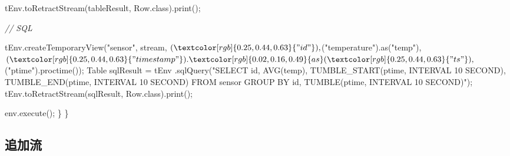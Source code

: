 \documentclass[cn,11pt,chinese]{elegantbook}
\newenvironment{Shaded}{}{}
\newcommand{\CommentTok}[1]{\textcolor[rgb]{0.38,0.63,0.69}{\textit{#1}}}
\newcommand{\FunctionTok}[1]{\textcolor[rgb]{0.02,0.16,0.49}{#1}}
\newcommand{\NormalTok}[1]{#1}
\newcommand{\StringTok}[1]{\textcolor[rgb]{0.25,0.44,0.63}{#1}}
\begin{document}
\begin{Shaded}
\begin{Highlighting}[]
\NormalTok{        tEnv.}\FunctionTok{toRetractStream}\NormalTok{(tableResult, Row.}\FunctionTok{class}\NormalTok{).}\FunctionTok{print}\NormalTok{();}

        \CommentTok{// SQL}

\NormalTok{        tEnv.}\FunctionTok{createTemporaryView}\NormalTok{(}\StringTok{"sensor"}\NormalTok{, stream, $(}\StringTok{"id"}\NormalTok{), $(}\StringTok{"temperature"}\NormalTok{).}\FunctionTok{as}\NormalTok{(}\StringTok{"temp"}\NormalTok{), $(}\StringTok{"timestamp"}\NormalTok{).}\FunctionTok{as}\NormalTok{(}\StringTok{"ts"}\NormalTok{), $(}\StringTok{"ptime"}\NormalTok{).}\FunctionTok{proctime}\NormalTok{());}
\NormalTok{        Table sqlResult = tEnv}
\NormalTok{                .}\FunctionTok{sqlQuery}\NormalTok{(}\StringTok{"SELECT id, AVG(temp), TUMBLE\_START(ptime, INTERVAL \textquotesingle{}10\textquotesingle{} SECOND), TUMBLE\_END(ptime, INTERVAL \textquotesingle{}10\textquotesingle{} SECOND) FROM sensor GROUP BY id, TUMBLE(ptime, INTERVAL \textquotesingle{}10\textquotesingle{} SECOND)"}\NormalTok{);}
\NormalTok{        tEnv.}\FunctionTok{toRetractStream}\NormalTok{(sqlResult, Row.}\FunctionTok{class}\NormalTok{).}\FunctionTok{print}\NormalTok{();}

\NormalTok{        env.}\FunctionTok{execute}\NormalTok{();}
\NormalTok{    \}}
\NormalTok{\}}
\end{Highlighting}
\end{Shaded}

\hypertarget{ux8ffdux52a0ux6d41}{%
\subsection{追加流}\label{ux8ffdux52a0ux6d41}}
\end{document}

